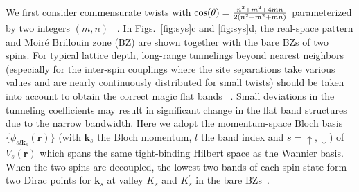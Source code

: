 \documentclass[twocolumn,english,prl,floatfix,citeautoscript,nofootinbib]{revtex4}
\begin{document}
We first consider commensurate twists with $\cos (\theta )=\frac{%
n^{2}+m^{2}+4mn}{2(n^{2}+m^{2}+mn)}$ parameterized by two integers $(m,n)$~%
\cite{PhysRevLett.99.256802}. In Figs.~\ref{fig:sys}c and %
\ref{fig:sys}d, the real-space pattern and Moir\'{e} Brillouin zone (BZ) are
shown together with the bare BZs of two spins.
For typical lattice depth, long-range tunnelings beyond nearest neighbors
(especially for the inter-spin couplings where the site separations take
various values and are nearly continuously distributed for small twists)
should be taken into account to obtain the correct magic flat bands~\cite{SM}%
. Small deviations in the tunneling coefficients may result in significant
change in the flat band structures due to the narrow bandwidth. Here we adopt the momentum-space Bloch basis $\{\phi
_{sl\mathbf{k}_{s}}(\mathbf{r})\}$ (with $\mathbf{k}_{s}$ the Bloch
momentum, $l$ the band index and $s=\uparrow ,\downarrow $) of $V_{s}(%
\mathbf{r})$ which spans the same tight-binding Hilbert space as the Wannier
basis. When the two spins are decoupled,
the lowest two bands of each spin state form two Dirac points for $\mathbf{k}%
_{s}$ at valley $K_{s}$ and $K_{s}^{\prime }$ in the bare BZs~\cite{SM}.
\end{document}

